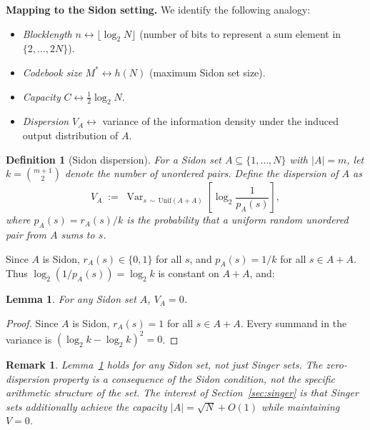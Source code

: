 \documentclass[12pt]{amsart}
\newtheorem{lemma}[theorem]{Lemma}
\newtheorem{remark}[theorem]{Remark}
\newtheorem{definition}[theorem]{Definition}
\newcommand{\Var}{\operatorname{Var}}
\begin{document}
\medskip
\noindent\textbf{Mapping to the Sidon setting.}
We identify the following analogy:
\begin{itemize}
\item \emph{Blocklength} $n \leftrightarrow \lfloor \log_2 N \rfloor$ (number of bits to represent a
  sum element in $\{2,\ldots,2N\}$).
\item \emph{Codebook size} $M^* \leftrightarrow h(N)$ (maximum Sidon set size).
\item \emph{Capacity} $C \leftrightarrow \tfrac{1}{2}\log_2 N$.
\item \emph{Dispersion} $V_A \leftrightarrow$ variance of the information density
  under the induced output distribution of $A$.
\end{itemize}

\begin{definition}[Sidon dispersion]
\label{def:dispersion}
For a Sidon set $A \subseteq \{1,\ldots,N\}$ with $|A| = m$, let $k =
\binom{m+1}{2}$ denote the number of unordered pairs.  Define the
\emph{dispersion} of $A$ as
\[
   V_A \;:=\; \Var_{s \,\sim\, \mathrm{Unif}(A+A)}\!\left[\log_2 \frac{1}{p_A(s)}\right],
\]
where $p_A(s) = r_A(s)/k$ is the probability that a uniform random unordered
pair from $A$ sums to $s$.
\end{definition}

Since $A$ is Sidon, $r_A(s) \in \{0, 1\}$ for all $s$, and $p_A(s) = 1/k$
for all $s \in A+A$.  Thus $\log_2(1/p_A(s)) = \log_2 k$ is constant on
$A + A$, and:

\begin{lemma}
\label{lem:sidon-dispersion}
For any Sidon set $A$, $V_A = 0$.
\end{lemma}

\begin{proof}
Since $A$ is Sidon, $r_A(s) = 1$ for all $s \in A + A$.  Every summand in the
variance is $({\log_2 k} - {\log_2 k})^2 = 0$.
\end{proof}

\begin{remark}
Lemma~\ref{lem:sidon-dispersion} holds for \emph{any} Sidon set, not just
Singer sets.  The zero-dispersion property is a consequence of the Sidon
condition, not the specific arithmetic structure of the set.  The interest of
Section~\ref{sec:singer} is that Singer sets additionally achieve the
\emph{capacity} $|A| = \sqrt{N} + O(1)$ while maintaining $V = 0$.
\end{remark}
\end{document}
